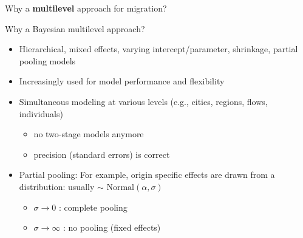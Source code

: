 \documentclass{beamer}
\begin{document}
\begin{frame}[fragile]{Why a \textbf{multilevel} approach for migration?}
\begin{description}
\begin{figure}
	\end{figure}
\end{description}
\end{frame}

\begin{frame}{Why a Bayesian multilevel approach?}
\begin{itemize}
	\item Hierarchical, mixed effects, varying intercept/parameter, shrinkage, partial pooling models\pause
	\item Increasingly used for model \alert{performance} and \alert{flexibility} \pause
    \item \alert{Simultaneous} modeling at various levels (e.g., cities, regions, flows, individuals) 
    \begin{itemize}
    	\item no two-stage models anymore 
    	\item precision (standard errors) is correct\pause
    \end{itemize}
	\item \alert{Partial pooling}: For example, origin specific effects are drawn from a distribution: usually $\sim \text{ Normal}(\alpha, \sigma)$
	\begin{itemize}
		\item $\sigma \longrightarrow 0$ : complete pooling
		\item $\sigma \longrightarrow \infty$ : no pooling (fixed effects)
	\end{itemize}
\end{itemize}
\end{frame}
\end{document}
